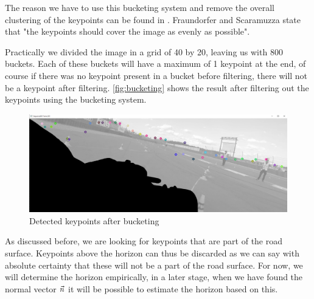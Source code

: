 The reason we have to use this bucketing system and remove the overall clustering of the keypoints can be found in \cite{6153423}. Fraundorfer and Scaramuzza state that "the keypoints should cover the image as evenly as possible".\bigskip 


Practically we divided the image in a grid of 40 by 20, leaving us with 800 buckets. Each of these buckets will have a maximum of 1 keypoint at the end, of course if there was no keypoint present in a bucket before filtering, there will not be a keypoint after filtering. \autoref{fig:bucketing} shows the result after filtering out the keypoints using the bucketing system.\bigskip

\begin{figure}
    \centering
    \includegraphics[width=1\textwidth]{figures/bucketing_filtered.png}
    \caption{Detected keypoints after bucketing}
    \label{fig:bucketing}
\end{figure}

As discussed before, we are looking for keypoints that are part of the road surface. Keypoints above the horizon can thus be discarded as we can say with absolute certainty that these will not be a part of the road surface. For now, we will determine the horizon empirically, in a later stage, when we have found the normal vector $\vec n$ it will be possible to estimate the horizon based on this.\bigskip

